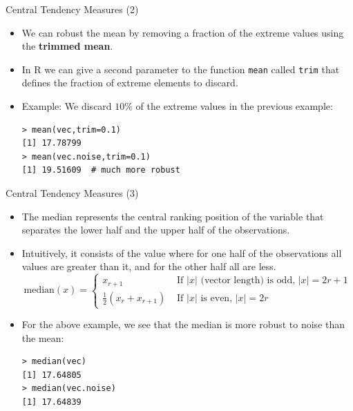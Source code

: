 \documentclass[handout]{beamer}
\begin{document}
\begin{frame}[fragile]{Central Tendency Measures (2)}
\scriptsize{
\begin{itemize}
 \item We can robust the mean by removing a fraction of the extreme values using the \textbf{trimmed mean}.
 \item In R we can give a second parameter to the function \verb+mean+ called \verb+trim+ that defines the fraction of extreme elements to discard. 
 \item Example: We discard $10\%$ of the extreme values in the previous example:
 \begin{verbatim}
> mean(vec,trim=0.1)
[1] 17.78799
> mean(vec.noise,trim=0.1)
[1] 19.51609  # much more robust  
\end{verbatim}

 
\end{itemize}

 
}
 
\end{frame}


\begin{frame}[fragile]{Central Tendency Measures (3)}
\scriptsize{
\begin{itemize}
 \item The median represents the central ranking position of the variable that separates the lower half and the upper half of the observations.
 \item Intuitively, it consists of the value where for one half of the observations all values are greater than it, and for the other half all are less.
   \begin{displaymath}
  \text{median}(x) =  \left\{ \begin{array}{rl}
    x_{r+1} &\mbox{ If $|x|$ (vector length) is odd, $|x|=2r+1$} \\
   \frac{1}{2}(x_r + x_{r+1}) &\mbox{ If $|x|$ is even, $|x|=2r$ }
       \end{array} \right.
  \end{displaymath}
 
 \item For the above example, we see that the median is more robust to noise than the mean:
 \begin{verbatim}
> median(vec)
[1] 17.64805
> median(vec.noise)
[1] 17.64839
 \end{verbatim}

 
\end{itemize}

 
}
 
\end{frame}
\end{document}
